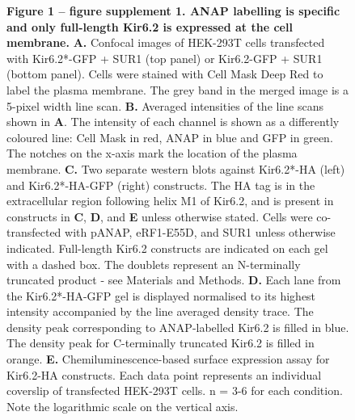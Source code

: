 \documentclass[10pt,lineno, doublespacing]{elife}
\begin{document}
\begin{figure}[t]\ContinuedFloat
\begin{fullwidth}
\captionsetup{labelformat=empty}
\caption{\textbf{Figure 1 -- figure supplement 1. ANAP labelling is specific and only full-length Kir6.2 is expressed at the cell membrane.}
\textbf{A.}
Confocal images of HEK-293T cells transfected with Kir6.2*-GFP + SUR1 (top panel) or Kir6.2-GFP + SUR1 (bottom panel).
Cells were stained with Cell Mask Deep Red to label the plasma membrane.
The grey band in the merged image is a 5-pixel width line scan.
\textbf{B.}
Averaged intensities of the line scans shown in \textbf{A}.
The intensity of each channel is shown as a differently coloured line: Cell Mask in red, ANAP in blue and GFP in green.
The notches on the x-axis mark the location of the plasma membrane.
\textbf{C.}
Two separate western blots against Kir6.2*-HA (left) and Kir6.2*-HA-GFP (right) constructs.
The HA tag is in the extracellular region following helix M1 of Kir6.2, and is present in constructs in \textbf{C}, \textbf{D}, and \textbf{E} unless otherwise stated.
Cells were co-transfected with pANAP, eRF1-E55D, and SUR1 unless otherwise indicated.
Full-length Kir6.2 constructs are indicated on each gel with a dashed box.
The doublets represent an N-terminally truncated product - see Materials and Methods.
\textbf{D.}
Each lane from the Kir6.2*-HA-GFP gel is displayed normalised to its highest intensity accompanied by the line averaged density trace.
The density peak corresponding to ANAP-labelled Kir6.2 is filled in blue. The density peak for C-terminally truncated Kir6.2 is filled in orange.
\textbf{E.}
Chemiluminescence-based surface expression assay for Kir6.2-HA constructs.
Each data point represents an individual coverslip of transfected HEK-293T cells.
n = 3-6 for each condition.
Note the logarithmic scale on the vertical axis.
}
\end{fullwidth}
\end{figure}

\FloatBarrier
\end{document}
